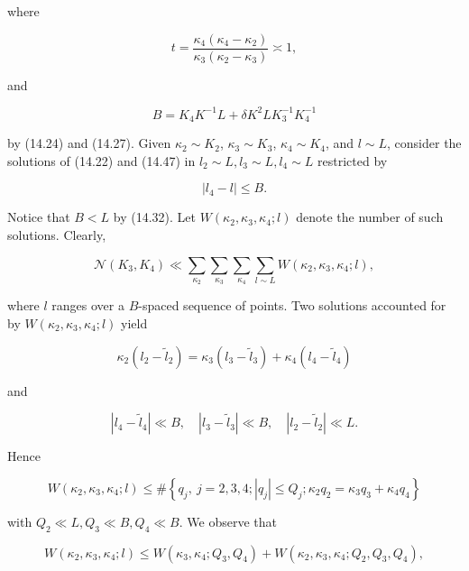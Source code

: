 \documentclass[10pt]{article}
\begin{document}
where


\begin{equation*}
t=\frac{\kappa_{4}\left(\kappa_{4}-\kappa_{2}\right)}{\kappa_{3}\left(\kappa_{2}-\kappa_{3}\right)} \asymp 1, \tag{14.48}
\end{equation*}


and


\begin{equation*}
B=K_{4} K^{-1} L+\delta K^{2} L K_{3}^{-1} K_{4}^{-1} \tag{14.49}
\end{equation*}


by (14.24) and (14.27). Given $\kappa_{2}\sim K_{2}$, $\kappa_{3}\sim K_{3}$, $\kappa_{4}\sim K_{4}$, and $l\sim L$, consider the solutions of (14.22) and (14.47) in $l_{2} \sim L, l_{3} \sim L, l_{4} \sim L$ restricted by


\begin{equation*}
\left|l_{4}-l\right| \leqslant B . \tag{14.50}
\end{equation*}


Notice that $B<L$ by (14.32). Let $W\left(\kappa_{2}, \kappa_{3}, \kappa_{4} ; l\right)$ denote the number of such solutions. Clearly,


\begin{equation*}
\mathscr{N}(K_{3},K_{4})\ll \sum_{\kappa_{2}} \sum_{\kappa_{3}} \sum_{\kappa_{4}} \sum_{l \sim L} W\left(\kappa_{2}, \kappa_{3}, \kappa_{4} ; l\right), \tag{14.51}
\end{equation*}


where $l$ ranges over a $B$-spaced sequence of points. Two solutions accounted for by $W\left(\kappa_{2}, \kappa_{3}, \kappa_{4} ; l\right)$ yield

$$
\kappa_{2}\left(l_{2}-\widetilde l_{2}\right)=\kappa_{3}\left(l_{3}-\widetilde l_{3}\right)+\kappa_{4}\left(l_{4}-\widetilde l_{4}\right)
$$

and

$$
\left|l_{4}-\widetilde l_{4}\right|\ll B,\quad\left|l_{3}-\widetilde l_{3}\right|\ll B,\quad\left|l_{2}-\widetilde l_{2}\right|\ll L .
$$

Hence

$$
W\left(\kappa_{2},\kappa_{3},\kappa_{4};l\right) \leqslant \#\left\{q_{j},\ j=2,3,4;\left|q_{j}\right| \leqslant Q_{j} ; \kappa_{2} q_{2}=\kappa_{3} q_{3}+\kappa_{4} q_{4}\right\}
$$

with $Q_{2} \ll L, Q_{3} \ll B, Q_{4}\ll B$. We observe that


\begin{equation*}
W\left(\kappa_{2}, \kappa_{3}, \kappa_{4} ; l\right) \leqslant W\left(\kappa_{3},\kappa_{4};Q_{3},Q_{4}\right)+W\left(\kappa_{2}, \kappa_{3}, \kappa_{4} ; Q_{2}, Q_{3}, Q_{4}\right), \tag{14.52}
\end{equation*}
\end{document}
